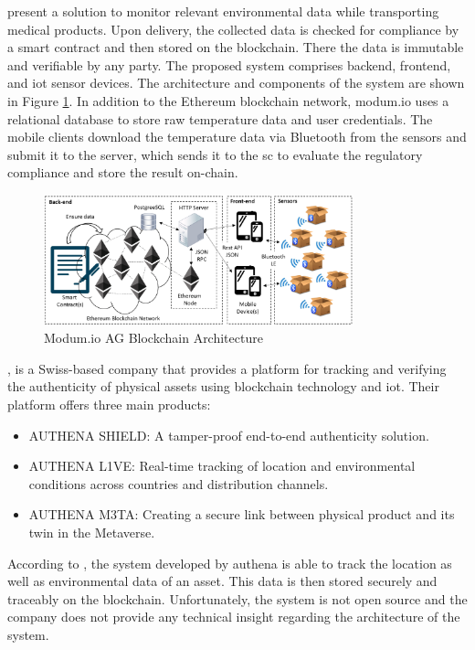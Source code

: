 \textcite{modum.io} present a solution to monitor relevant environmental data while transporting medical products. Upon delivery, the collected data is checked for compliance by a smart contract and then stored on the blockchain. There the data is immutable and verifiable by any party. The proposed system comprises backend, frontend, and \gls{iot} sensor devices. The architecture and components of the system are shown in Figure \ref{fig:modum.io}. In addition to the Ethereum blockchain network, modum.io uses a relational database to store raw temperature data and user credentials. The mobile clients download the temperature data via Bluetooth from the sensors and submit it to the server, which sends it to the \gls{sc} to evaluate the regulatory compliance and store the result \gls{on-chain}.

\begin{figure}[ht]
    \centering
    \includegraphics[width=0.8\textwidth]{diagrams/modum_architecutre.png}
    \caption{Modum.io AG Blockchain Architecture \cite{modum.io}}
    \label{fig:modum.io}
\end{figure}

\textcite{authena}, is a Swiss-based company that provides a platform for tracking and verifying the authenticity of physical assets using blockchain technology and \gls{iot}. Their platform offers three main products:
\begin{itemize}
    \item AUTHENA SHIELD: A tamper-proof end-to-end authenticity solution.
    \item AUTHENA L1VE: Real-time tracking of location and environmental conditions across countries and distribution channels.
    \item AUTHENA M3TA: Creating a secure link between physical product and its twin in the Metaverse.
\end{itemize}
According to \cite{authenahandelszeitung}, the system developed by authena is able to track the location as well as environmental data of an asset. This data is then stored securely and traceably on the blockchain. Unfortunately, the system is not open source and the company does not provide any technical insight regarding the architecture of the system.

